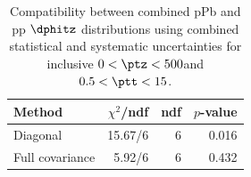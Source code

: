 \begin{table}[htp!]
\centering
\begin{tabular}{|l|r|r|r|}
\hline
Method & $\chi^2$/ndf & ndf & $p$-value \\
\hline
Diagonal & 15.67/6 & 6 & 0.016 \\
Full covariance & 5.92/6 & 6 & 0.432 \\
\hline
\end{tabular}
\caption{Compatibility between combined pPb and pp $\dphitz$ distributions using combined statistical and systematic uncertainties for inclusive $0 < \ptz < 500$\GeV and $0.5 < \ptt < 15$\GeV.}
\label{table:chisq_dphi}
\end{table}
